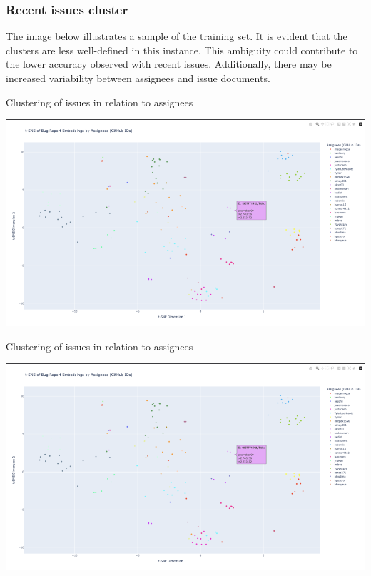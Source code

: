 \documentclass[tikz,10pt,fleqn]{article}
\begin{document}
\subsubsection{Recent issues cluster}
The image below illustrates a sample of the training set. It is evident that the clusters are less well-defined in this instance. This ambiguity could contribute to the lower accuracy observed with recent issues. Additionally, there may be increased variability between assignees and issue documents.
\begin{table}[H]
	\centering
	\caption{Clustering of issues in relation to assignees}
	\includegraphics[width=\textwidth]{plot_sparse.png}
\end{table}


\begin{table}[H]
	\centering
	\caption{Clustering of issues in relation to assignees}
	\includegraphics[width=\textwidth]{plot_sparse.png}
\end{table}
\end{document}
